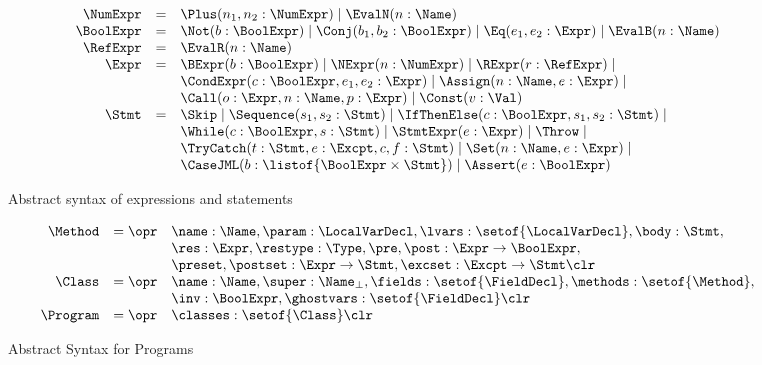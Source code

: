 \begin{figure}[t]
\[
\begin{array}{rcl}
\NumExpr & = & \Plus(n_1, n_2 : \NumExpr) \mid \EvalN(n : \Name) \\
\BoolExpr & = & \Not(b : \BoolExpr) \mid \Conj(b_1,
b_2 : \BoolExpr) \mid \Eq(e_1, e_2 : \Expr) \mid \EvalB(n : \Name) \\
\RefExpr & = & \EvalR(n : \Name)\\
\Expr & = & \BExpr(b : \BoolExpr) \mid
            \NExpr(n : \NumExpr) \mid
            \RExpr(r : \RefExpr) \mid\\
      &   & \CondExpr(c : \BoolExpr, e_1, e_2 : \Expr) \mid
            \Assign(n : \Name, e : \Expr) \mid \\
      &   & \Call(o : \Expr, n : \Name, p : \Expr) \mid
            \Const(v : \Val) \\
\Stmt & = & \Skip \mid
            \Sequence(s_1, s_2 : \Stmt) \mid
            \IfThenElse(c : \BoolExpr, s_1, s_2 : \Stmt) \mid\\
      &   & \While(c : \BoolExpr, s : \Stmt) \mid
            \StmtExpr(e : \Expr) \mid
            \Throw \mid\\
      &   & \TryCatch(t: \Stmt, e : \Excpt, c, f : \Stmt) \mid
            \Set(n : \Name, e : \Expr) \mid\\
      &   & \CaseJML(b : \listof{\BoolExpr \times \Stmt}) \mid
            \Assert(e : \BoolExpr)
\end{array}
\]
\caption{Abstract syntax of expressions and
statements}\label{FigExprStmt}
\end{figure}

\begin{figure}[t]
\[
\begin{array}{rcl}
\Method & = \opr & \name : \Name,
                   \param : \LocalVarDecl,
                   \lvars : \setof{\LocalVarDecl},
                   \body : \Stmt,\\
        &        & \res : \Expr,
                   \restype : \Type,
                   \pre, \post : \Expr \rightarrow \BoolExpr, \\
        &        & \preset, \postset : \Expr \rightarrow \Stmt,
                   \excset : \Excpt \rightarrow \Stmt \clr \\
\Class & = \opr & \name : \Name,
                  \super : \Name_{\bot},
                  \fields : \setof{\FieldDecl},
                  \methods : \setof{\Method},\\
        &       & \inv : \BoolExpr,
                  \ghostvars : \setof{\FieldDecl} \clr\\
\Program & = \opr & \classes : \setof{\Class} \clr
\end{array}
\]
\caption{Abstract Syntax for Programs}\label{FigProgram}
\end{figure}

